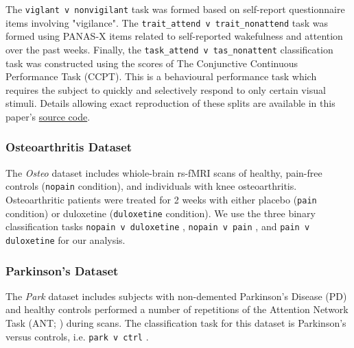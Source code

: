 \documentclass[12pt]{spieman}  %
\newcommand{\code}[1]{\small \texttt{#1} \normalsize}
\begin{document}
\begin{spacing}{2}
The \code{viglant v nonvigilant} task was formed based on self-report
questionnaire items involving
"vigilance"\cite{gorgolewskiCorrespondenceIndividualDifferences2014}. The
\code{trait\_attend v trait\_nonattend} task was formed using PANAS-X
\cite{watsonPANASXManualPositive1994} items related to self-reported
wakefulness and attention over the past weeks. Finally, the
\code{task\_attend v tas\_nonattent} classification task was constructed
using the scores of The Conjunctive Continuous Performance Task
(CCPT\cite{shalevConjunctiveContinuousPerformance2011}). This is a behavioural
performance task which requires the subject to quickly and selectively respond
to only certain visual stimuli. Details allowing exact reproduction of these
splits are available in this paper's
\href{https://github.com/DM-Berger/random-matrix-fmri/blob/master/code/rmt/preprocess/unify\_attention\_data.py}{source
code}.



\subsubsection{Osteoarthritis Dataset}
The \textit{Osteo} dataset\cite{tetreaultBrainConnectivityPredicts2016}
includes whiole-brain rs-fMRI scans of healthy, pain-free controls
(\code{nopain} condition), and individuals with knee osteoarthritis.
Osteoarthritic patients were treated for 2 weeks with either placebo
(\code{pain} condition) or duloxetine (\code{duloxetine} condition).
We use the three binary classification tasks \code{nopain v duloxetine},
\code{nopain v pain}, and \code{pain v duloxetine} for our analysis.



\subsubsection{Parkinson's Dataset}
The \textit{Park} dataset\cite{madhyasthaDynamicConnectivityRest2015} includes
subjects with non-demented Parkinson's Disease (PD) and
healthy controls performed a number of repetitions of the Attention Network
Task (ANT; \cite{fanActivationAttentionalNetworks2005}) during scans.
The classification task for this dataset is Parkinson's versus controls, i.e.
\code{park v ctrl}.




\end{spacing}
\end{document}
